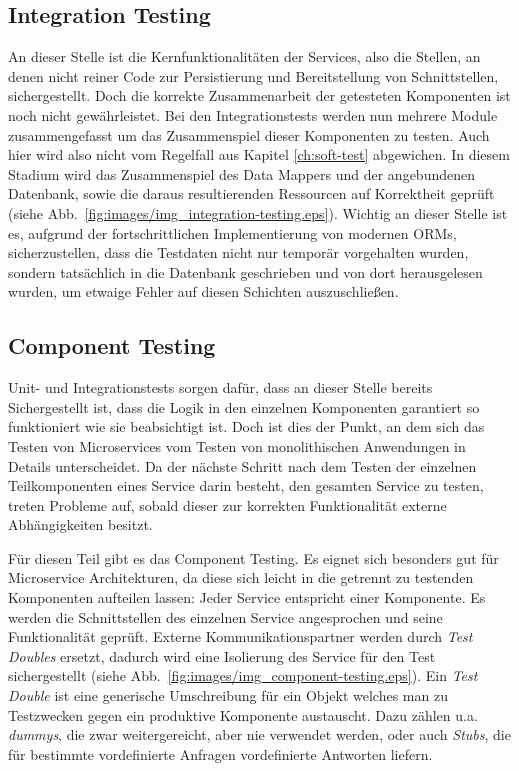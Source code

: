 \documentclass[12pt,a4paper,bibliography=totocnumbered,listof=totocnumbered]{scrartcl}
\begin{document}

\subsection{Integration Testing}

An dieser Stelle ist die Kernfunktionalitäten der Services, also die Stellen, an denen nicht reiner Code zur Persistierung und Bereitstellung von Schnittstellen, sichergestellt. Doch die korrekte Zusammenarbeit der getesteten Komponenten ist noch nicht gewährleistet. Bei den Integrationstests werden nun mehrere Module zusammengefasst um das Zusammenspiel dieser Komponenten zu testen.\cite{clemson} Auch hier wird also nicht vom Regelfall aus Kapitel \ref{ch:soft-test} abgewichen. In diesem Stadium wird das Zusammenspiel des Data Mappers und der angebundenen Datenbank, sowie die daraus resultierenden Ressourcen auf Korrektheit geprüft (siehe Abb.~\ref{fig:images/img_integration-testing.eps}). Wichtig an dieser Stelle ist es, aufgrund der fortschrittlichen Implementierung von modernen \acp{ORM}, sicherzustellen, dass die Testdaten nicht nur temporär vorgehalten wurden, sondern tatsächlich in die Datenbank geschrieben und von dort herausgelesen wurden, um etwaige Fehler auf diesen Schichten auszuschließen.\cite{clemson}


\subsection{Component Testing}

Unit- und Integrationstests sorgen dafür, dass an dieser Stelle bereits Sichergestellt ist, dass die Logik in den einzelnen Komponenten garantiert so funktioniert wie sie beabsichtigt ist. Doch ist dies der Punkt, an dem sich das Testen von Microservices vom Testen von monolithischen Anwendungen in Details unterscheidet. Da der nächste Schritt nach dem Testen der einzelnen Teilkomponenten eines Service darin besteht, den gesamten Service zu testen, treten Probleme auf, sobald dieser zur korrekten Funktionalität externe Abhängigkeiten besitzt.

Für diesen Teil gibt es das Component Testing. Es eignet sich besonders gut für Microservice Architekturen, da diese sich leicht in die getrennt zu testenden Komponenten aufteilen lassen: Jeder Service entspricht einer Komponente. Es werden die Schnittstellen des einzelnen Service angesprochen und seine Funktionalität geprüft. Externe Kommunikationspartner werden durch \textit{Test Doubles} ersetzt, dadurch wird eine Isolierung des Service für den Test sichergestellt (siehe Abb.~\ref{fig:images/img_component-testing.eps}).\cite{clemson} Ein \textit{Test Double} ist eine generische Umschreibung für ein Objekt welches man zu Testzwecken gegen ein produktive Komponente austauscht. Dazu zählen u.a. \textit{dummys}, die zwar weitergereicht, aber nie verwendet werden, oder auch \textit{Stubs}, die für bestimmte vordefinierte Anfragen vordefinierte Antworten liefern.\cite{fowlertestdouble}
\end{document}
